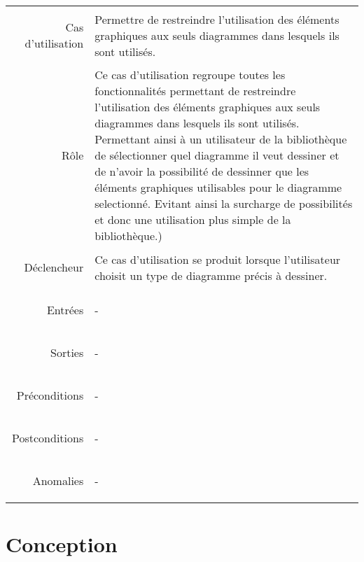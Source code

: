 \documentclass[12pt,a4paper,openany]{report}
\begin{document}
\begin{longtable}{>{\begin{bf}} r <{\end{bf}}!{:}p{13.5cm}}
	Cas d'utilisation & Permettre de restreindre l'utilisation des éléments graphiques aux seuls diagrammes dans lesquels ils sont utilisés.\\
	Rôle & Ce cas d'utilisation regroupe toutes les fonctionnalités permettant de restreindre l'utilisation des éléments
	graphiques aux seuls diagrammes dans lesquels ils sont utilisés. Permettant ainsi à un utilisateur de la bibliothèque de sélectionner quel
	diagramme il veut dessiner et de n'avoir la possibilité de dessinner que les éléments graphiques utilisables pour le diagramme selectionné.
	Evitant ainsi la surcharge de possibilités et donc une utilisation plus simple de la bibliothèque.)\\
	Déclencheur & Ce cas d'utilisation se produit lorsque l'utilisateur choisit un type de diagramme précis à dessiner.\\
	Entrées & -\\
	Sorties & -\\
	Préconditions & -\\
	Postconditions & -\\\vspace{10px}
	Anomalies & -\\
	\end{longtable}

	\chapter{Conception}
\end{document}
